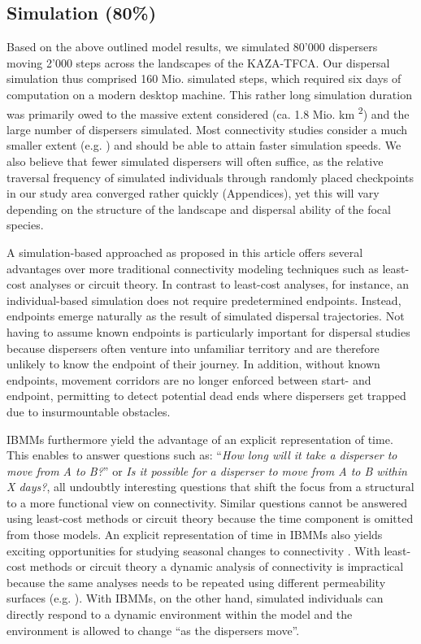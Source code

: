 \documentclass[abstract=on,10pt,a4paper,bibliography=totocnumbered]{article}
\begin{document}
\subsection{Simulation (80\%)}
Based on the above outlined model results, we simulated 80'000 dispersers moving
2'000 steps across the landscapes of the KAZA-TFCA. Our dispersal simulation
thus comprised 160 Mio. simulated steps, which required six days of computation
on a modern desktop machine. This rather long simulation duration was primarily
owed to the massive extent considered (ca. 1.8 Mio. km \textsuperscript{2}) and
the large number of dispersers simulated. Most connectivity studies consider a
much smaller extent (e.g. \citealp{Kanagaraj.2013, Abrahms.2017, Zeller.2020})
and should be able to attain faster simulation speeds. We also believe that
fewer simulated dispersers will often suffice, as the relative traversal
frequency of simulated individuals through randomly placed checkpoints in our
study area converged rather quickly (Appendices), yet this will vary depending
on the structure of the landscape and dispersal ability of the focal species.

A simulation-based approached as proposed in this article offers several
advantages over more traditional connectivity modeling techniques such as
least-cost analyses or circuit theory. In contrast to least-cost analyses, for
instance, an individual-based simulation does not require predetermined
endpoints. Instead, endpoints emerge naturally as the result of simulated
dispersal trajectories. Not having to assume known endpoints is particularly
important for dispersal studies because dispersers often venture into unfamiliar
territory and are therefore unlikely to know the endpoint of their journey. In
addition, without known endpoints, movement corridors are no longer enforced
between start- and endpoint, permitting to detect potential dead ends where
dispersers get trapped due to insurmountable obstacles.

IBMMs furthermore yield the advantage of an explicit representation of time.
This enables to answer questions such as: ``\textit{How long will it take a
disperser to move from A to B?}'' or \textit{Is it possible for a disperser to
move from A to B within X days?}, all undoubtly interesting questions that shift
the focus from a structural to a more functional view on connectivity. Similar
questions cannot be answered using least-cost methods or circuit theory because
the time component is omitted from those models. An explicit representation of
time in IBMMs also yields exciting opportunities for studying seasonal changes
to connectivity \cite{Zeller.2020}. With least-cost methods or circuit theory a
dynamic analysis of connectivity is impractical because the same analyses needs
to be repeated using different permeability surfaces (e.g. \citealp{Benz.2016,
Osipova.2019}). With IBMMs, on the other hand, simulated individuals can
directly respond to a dynamic environment within the model and the environment
is allowed to change ``as the dispersers move''.
\end{document}
